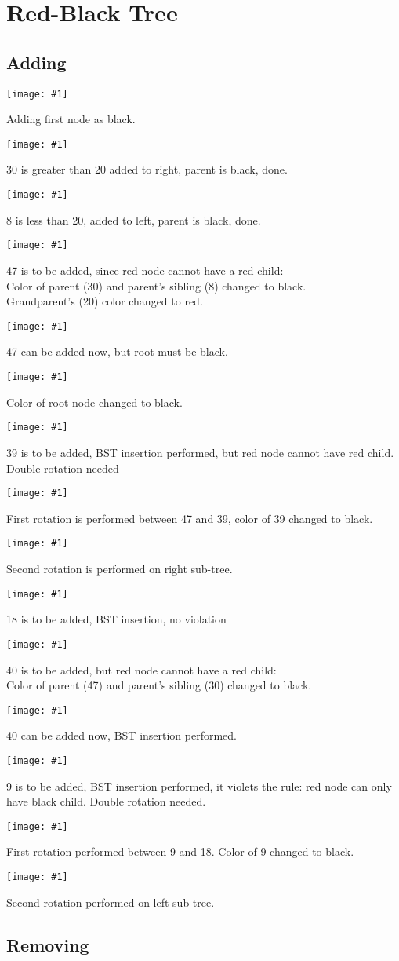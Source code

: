 \documentclass[a4paper]{article}
\newcommand{\image}[2] {
  \noindent\begin{minipage}[c]{.6\textwidth}%
    \centering
    \strut\vspace*{-\baselineskip}\newline\texttt{[image: \#1]}
  \end{minipage}%
  \hfill%
  \begin{minipage}[c]{.4\textwidth}
    #2
  \end{minipage}
}
\begin{document}
  \newpage

  \section{Red-Black Tree}
  \subsection{Adding}

  \image{rb/add/0.png}{Adding first node as black.}
  \image{rb/add/1.png}{30 is greater than 20 added to right, parent is black, done.}
  \image{rb/add/2.png}{8 is less than 20, added to left, parent is black, done.}
  \image{rb/add/3.png}{47 is to be added, since red node cannot have a red child:
    \\Color of parent (30) and parent's sibling (8) changed to black.
    \\ Grandparent's (20) color changed to red.}
  \image{rb/add/4.png}{47 can be added now, but root must be black.}
  \image{rb/add/5.png}{Color of root node changed to black.}
  \image{rb/add/6.png}{39 is to be added, BST insertion performed, but red node cannot have red child. Double rotation needed}
  \image{rb/add/7.png}{First rotation is performed between 47 and 39, color of 39 changed to black.}
  \image{rb/add/8.png}{Second rotation is performed on right sub-tree.}
  \image{rb/add/9.png}{18 is to be added, BST insertion, no violation}
  \image{rb/add/10.png}{40 is to be added, but red node cannot have a red child:
    \\Color of parent (47) and parent's sibling (30) changed to black.}
  \image{rb/add/11.png}{40 can be added now, BST insertion performed.}
  \image{rb/add/12.png}{9 is to be added, BST insertion performed, it violets the rule: red node can only have black child. Double rotation needed.}
  \image{rb/add/13.png}{First rotation performed between 9 and 18. Color of 9 changed to black.}
  \image{rb/add/14.png}{Second rotation performed on left sub-tree.}
  
  \subsection{Removing}
\end{document}
